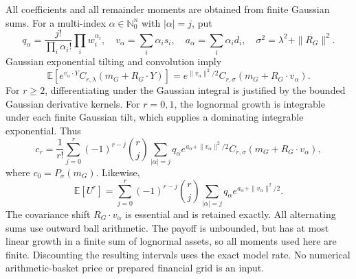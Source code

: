 All coefficients and all remainder moments are obtained from finite Gaussian sums. For a multi-index $\alpha\in\mathbb N_0^n$ with $|\alpha|=j$, put
\[
 q_\alpha=\frac{j!}{\prod_i\alpha_i!}\prod_iw_i^{\alpha_i},\quad
 v_\alpha=\sum_i\alpha_i s_i,\quad
 a_\alpha=\sum_i\alpha_i d_i,\quad
 \sigma^2=\lambda^2+\|R_G\|^2.
\]
Gaussian exponential tilting and convolution imply
\[
 \mathbb E[e^{v_\alpha\cdot Y}C_{r,\lambda}(m_G+R_G\cdot Y)]
 =e^{\|v_\alpha\|^2/2}C_{r,\sigma}(m_G+R_G\cdot v_\alpha).
\]
For $r\geq2$, differentiating under the Gaussian integral is justified by the bounded Gaussian derivative kernels. For $r=0,1$, the lognormal growth is integrable under each finite Gaussian tilt, which supplies a dominating integrable exponential. Thus
\[
 c_r=\frac1{r!}\sum_{j=0}^{r}(-1)^{r-j}{r\choose j}
 \sum_{|\alpha|=j}q_\alpha e^{a_\alpha+\|v_\alpha\|^2/2}
 C_{r,\sigma}(m_G+R_G\cdot v_\alpha),
\]
where $c_0=P_\sigma(m_G)$. Likewise,
\[
 \mathbb E[U^r]=\sum_{j=0}^{r}(-1)^{r-j}{r\choose j}
 \sum_{|\alpha|=j}q_\alpha e^{a_\alpha+\|v_\alpha\|^2/2}.
\]
The covariance shift $R_G\cdot v_\alpha$ is essential and is retained exactly. All alternating sums use outward ball arithmetic. The payoff is unbounded, but has at most linear growth in a finite sum of lognormal assets, so all moments used here are finite. Discounting the resulting intervals uses the exact model rate. No numerical arithmetic-basket price or prepared financial grid is an input.
